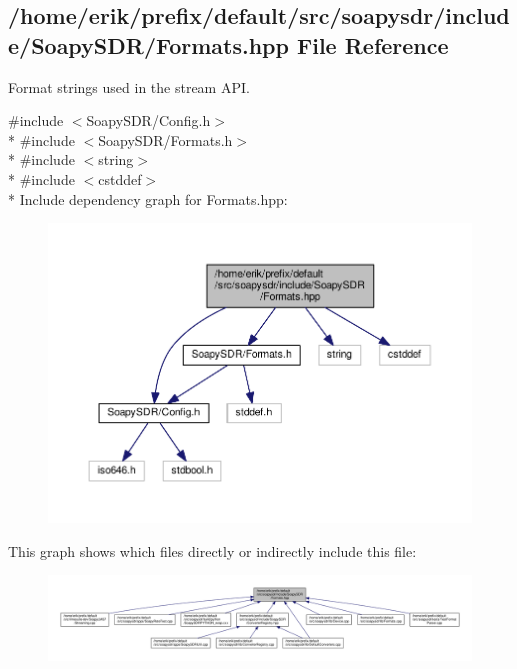 \subsection{/home/erik/prefix/default/src/soapysdr/include/\+Soapy\+S\+D\+R/\+Formats.hpp File Reference}
\label{Formats_8hpp}


Format strings used in the stream A\+PI.  


{\ttfamily \#include $<$Soapy\+S\+D\+R/\+Config.\+h$>$}\\*
{\ttfamily \#include $<$Soapy\+S\+D\+R/\+Formats.\+h$>$}\\*
{\ttfamily \#include $<$string$>$}\\*
{\ttfamily \#include $<$cstddef$>$}\\*
Include dependency graph for Formats.\+hpp\+:
\nopagebreak
\begin{figure}[H]
\begin{center}
\leavevmode
\includegraphics[width=350pt]{df/d75/Formats_8hpp__incl}
\end{center}
\end{figure}
This graph shows which files directly or indirectly include this file\+:
\nopagebreak
\begin{figure}[H]
\begin{center}
\leavevmode
\includegraphics[width=350pt]{d0/d13/Formats_8hpp__dep__incl}
\end{center}
\end{figure}
